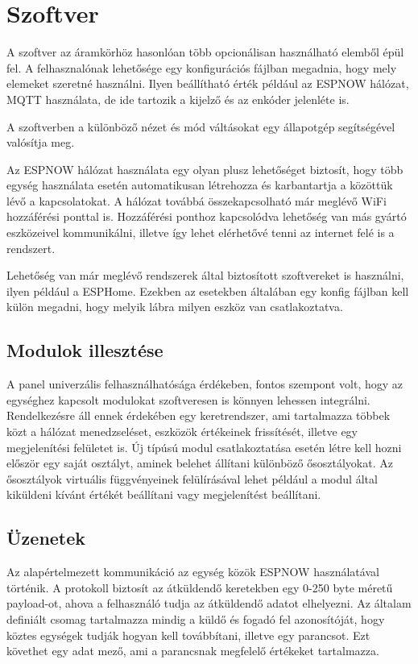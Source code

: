 \section{Szoftver}

A szoftver az áramkörhöz hasonlóan több opcionálisan használható elemből épül fel. A felhasznalónak lehetősége egy konfigurációs fájlban megadnia, hogy mely elemeket szeretné használni. Ilyen beállítható érték például az ESPNOW hálózat, MQTT használata, de ide tartozik a kijelző és az enkóder jelenléte is. 

A szoftverben a különböző nézet és mód váltásokat egy állapotgép segítségével valósítja meg. 

Az ESPNOW hálózat használata egy olyan plusz lehetőséget biztosít, hogy több egység használata esetén automatikusan létrehozza és karbantartja a közöttük lévő a kapcsolatokat. A hálózat továbbá összekapcsolható már meglévő WiFi hozzáférési ponttal is. Hozzáférési ponthoz kapcsolódva lehetőség van más gyártó eszközeivel kommunikálni, illetve így lehet elérhetővé tenni az internet felé is a rendszert.

Lehetőség van már meglévő rendszerek által biztosított szoftvereket is használni, ilyen például a ESPHome. Ezekben az esetekben általában egy konfig fájlban kell külön megadni, hogy melyik lábra milyen eszköz van csatlakoztatva.


\subsection{Modulok illesztése}
A panel univerzális felhasználhatósága érdékeben, fontos szempont volt, hogy az egységhez kapcsolt modulokat szoftveresen is könnyen lehessen integrálni. Rendelkezésre áll ennek érdekében egy keretrendszer, ami tartalmazza többek közt a hálózat menedzseléset, eszközök értékeinek frissítését, illetve egy megjelenítési felületet is.
Új típúsú modul csatlakoztatása esetén létre kell hozni először egy saját osztályt, aminek belehet állítani különböző ősosztályokat. Az ősosztályok virtuális függvényeinek felülírásával lehet például a modul által kiküldeni kívánt értékét beállítani vagy megjelenítést beállítani.

\subsection{Üzenetek}
Az alapértelmezett kommunikáció az egység közök ESPNOW használatával történik. A protokoll biztosít az átküldendő keretekben egy 0-250 byte méretű payload-ot, ahova a felhasználó tudja az átküldendő adatot elhelyezni. Az általam definiált csomag tartalmazza mindig a küldő és fogadó fel azonosítóját, hogy köztes egységek tudják hogyan kell továbbítani, illetve egy parancsot. Ezt követhet egy adat mező, ami a parancsnak megfelelő értékeket tartalmazza.

